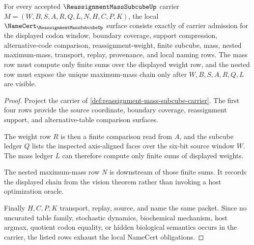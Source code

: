 \begin{theorem}
\label{thm:reassignment-mass-subcube-namecert-obligations}
For every accepted $\ReassignmentMassSubcubeUp$ carrier $M=(W,B,S,A,R,Q,L,N,H,C,P,K)$, the local $\NameCert_{\ReassignmentMassSubcubeUp}$ surface consists exactly of carrier admission for the displayed codon window, boundary coverage, support compression, alternative-code comparison, reassignment-weight, finite subcube, mass, nested maximum-mass, transport, replay, provenance, and local naming rows. The mass row must compute only finite sums over the displayed weight row, and the nested row must expose the unique maximum-mass chain only after $W,B,S,A,R,Q,L$ are visible.
\end{theorem}
\begin{proof}
Project the carrier of \autoref{def:reassignment-mass-subcube-carrier}. The first four rows provide the source coordinate, boundary coverage, reassignment support, and alternative-table comparison surfaces.

The weight row $R$ is then a finite comparison read from $A$, and the subcube ledger $Q$ lists the inspected axis-aligned faces over the six-bit source window $W$. The mass ledger $L$ can therefore compute only finite sums of displayed weights.

The nested maximum-mass row $N$ is downstream of those finite sums. It records the displayed chain from the vision theorem rather than invoking a host optimization oracle.

Finally $H,C,P,K$ transport, replay, source, and name the same packet. Since no uncurated table family, stochastic dynamics, biochemical mechanism, host argmax, quotient codon equality, or hidden biological semantics occurs in the carrier, the listed rows exhaust the local NameCert obligations.
\end{proof}

